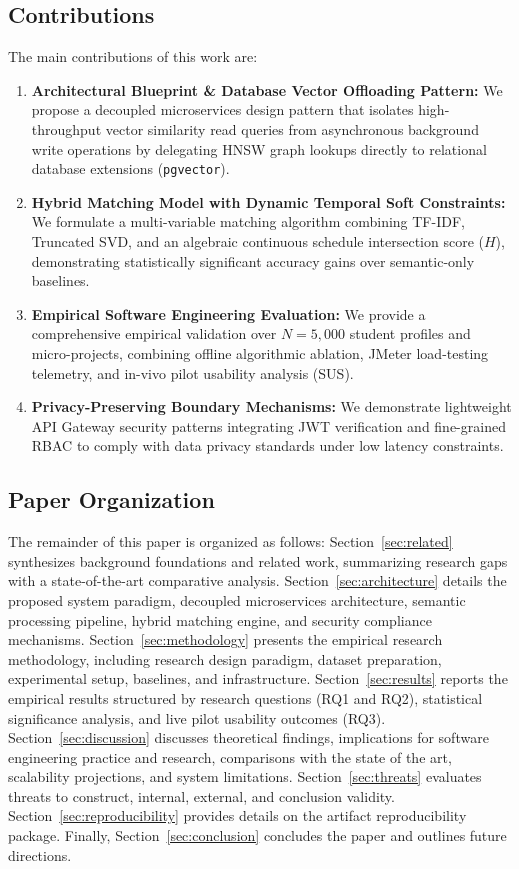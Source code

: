 \documentclass[a4paper,fleqn]{cas-dc}
\begin{document}
\subsection{Contributions}
The main contributions of this work are:
\begin{enumerate}
    \item \textbf{Architectural Blueprint \& Database Vector Offloading Pattern:} We propose a decoupled microservices design pattern that isolates high-throughput vector similarity read queries from asynchronous background write operations by delegating HNSW graph lookups directly to relational database extensions (\texttt{pgvector}).
    \item \textbf{Hybrid Matching Model with Dynamic Temporal Soft Constraints:} We formulate a multi-variable matching algorithm combining TF-IDF, Truncated SVD, and an algebraic continuous schedule intersection score ($H$), demonstrating statistically significant accuracy gains over semantic-only baselines.
    \item \textbf{Empirical Software Engineering Evaluation:} We provide a comprehensive empirical validation over $N = 5,000$ student profiles and micro-projects, combining offline algorithmic ablation, JMeter load-testing telemetry, and in-vivo pilot usability analysis (SUS).
    \item \textbf{Privacy-Preserving Boundary Mechanisms:} We demonstrate lightweight API Gateway security patterns integrating JWT verification and fine-grained RBAC to comply with data privacy standards \cite{ley29733} under low latency constraints.
\end{enumerate}

\subsection{Paper Organization}
The remainder of this paper is organized as follows: Section~\ref{sec:related} synthesizes background foundations and related work, summarizing research gaps with a state-of-the-art comparative analysis. Section~\ref{sec:architecture} details the proposed system paradigm, decoupled microservices architecture, semantic processing pipeline, hybrid matching engine, and security compliance mechanisms. Section~\ref{sec:methodology} presents the empirical research methodology, including research design paradigm, dataset preparation, experimental setup, baselines, and infrastructure. Section~\ref{sec:results} reports the empirical results structured by research questions (RQ1 and RQ2), statistical significance analysis, and live pilot usability outcomes (RQ3). Section~\ref{sec:discussion} discusses theoretical findings, implications for software engineering practice and research, comparisons with the state of the art, scalability projections, and system limitations. Section~\ref{sec:threats} evaluates threats to construct, internal, external, and conclusion validity. Section~\ref{sec:reproducibility} provides details on the artifact reproducibility package. Finally, Section~\ref{sec:conclusion} concludes the paper and outlines future directions.
\end{document}
